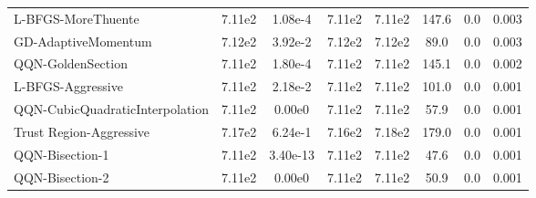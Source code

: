 \documentclass{article}
\begin{document}
\begin{table}[htbp]
{\begin{tabular}{p{2.5cm}*{7}{c}}
L-BFGS-MoreThuente & 7.11e2 & 1.08e-4 & 7.11e2 & 7.11e2 & 147.6 & 0.0 & 0.003 \\
GD-AdaptiveMomentum & 7.12e2 & 3.92e-2 & 7.12e2 & 7.12e2 & 89.0 & 0.0 & 0.003 \\
QQN-GoldenSection & 7.11e2 & 1.80e-4 & 7.11e2 & 7.11e2 & 145.1 & 0.0 & 0.002 \\
L-BFGS-Aggressive & 7.11e2 & 2.18e-2 & 7.11e2 & 7.11e2 & 101.0 & 0.0 & 0.001 \\
QQN-CubicQuadraticInterpolation & 7.11e2 & 0.00e0 & 7.11e2 & 7.11e2 & 57.9 & 0.0 & 0.001 \\
Trust Region-Aggressive & 7.17e2 & 6.24e-1 & 7.16e2 & 7.18e2 & 179.0 & 0.0 & 0.001 \\
QQN-Bisection-1 & 7.11e2 & 3.40e-13 & 7.11e2 & 7.11e2 & 47.6 & 0.0 & 0.001 \\
QQN-Bisection-2 & 7.11e2 & 0.00e0 & 7.11e2 & 7.11e2 & 50.9 & 0.0 & 0.001 \\
\bottomrule
\end{tabular}
}
\end{table}
\end{document}
